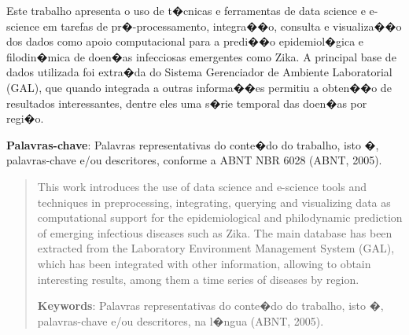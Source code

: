 \begin{resumo}

Este trabalho apresenta o uso de t�cnicas e ferramentas de data science e e-science em tarefas de pr�-processamento, integra��o, consulta e visualiza��o dos dados como apoio computacional para a predi��o epidemiol�gica e filodin�mica de doen�as infecciosas emergentes como Zika. A principal base de dados utilizada foi extra�da do Sistema Gerenciador de Ambiente Laboratorial (GAL), que quando integrada a outras informa��es permitiu a obten��o de resultados interessantes, dentre eles uma s�rie temporal das doen�as por regi�o.

{\hspace{-8mm} \bf{Palavras-chave}}: Palavras representativas do conte�do do trabalho, isto �, palavras-chave e/ou descritores, conforme a ABNT NBR 6028 (ABNT, 2005).

\end{resumo}

\begin{abstract}

This work introduces the use of data science and e-science tools and techniques in preprocessing, integrating, querying and visualizing data as computational support for the epidemiological and philodynamic prediction of emerging infectious diseases such as Zika. The main database has been extracted from the Laboratory Environment Management System (GAL), which has been integrated with other information, allowing to obtain interesting results, among them a time series of diseases by region.

{\hspace{-8mm} \bf{Keywords}}: Palavras representativas do conte�do do trabalho, isto �, palavras-chave e/ou descritores, na l�ngua (ABNT, 2005).

\end{abstract}

\listoffigures


\cleardoublepage
\listoftables
\cleardoublepage

